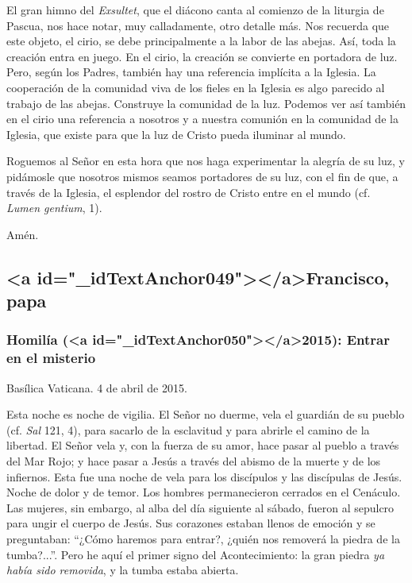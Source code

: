 			\begin{body}El gran himno del \textit{Exsultet}, que el diácono canta al comienzo de la liturgia de Pascua, nos hace notar, muy calladamente, otro detalle más. Nos recuerda que este objeto, el cirio, se debe principalmente a la labor de las abejas. Así, toda la creación entra en juego. En el cirio, la creación se convierte en portadora de luz. Pero, según los Padres, también hay una referencia implícita a la Iglesia. La cooperación de la comunidad viva de los fieles en la Iglesia es algo parecido al trabajo de las abejas. Construye la comunidad de la luz. Podemos ver así también en el cirio una referencia a nosotros y a nuestra comunión en la comunidad de la Iglesia, que existe para que la luz de Cristo pueda iluminar al mundo.\end{body}
			
			\begin{body}Roguemos al Señor en esta hora que nos haga experimentar la alegría de su luz, y pidámosle que nosotros mismos seamos portadores de su luz, con el fin de que, a través de la Iglesia, el esplendor del rostro de Cristo entre en el mundo (cf. \textit{Lumen gentium}, 1). \end{body}
			
			\begin{body}Amén.\end{body}
			
			\subsection{<a id="_idTextAnchor049"></a>Francisco, papa}
			
			\subsubsection{Homilía (<a id="_idTextAnchor050"></a>2015): Entrar en el misterio}
			
			\begin{referencia}Basílica Vaticana. 4 de abril de 2015.\end{referencia}
			
			\begin{body}Esta noche es noche de vigilia. El Señor no duerme, vela el guardián de su pueblo (cf. \textit{Sal} 121, 4), para sacarlo de la esclavitud y para abrirle el camino de la libertad. El Señor vela y, con la fuerza de su amor, hace pasar al pueblo a través del Mar Rojo; y hace pasar a Jesús a través del abismo de la muerte y de los infiernos. Esta fue una noche de vela para los discípulos y las discípulas de Jesús. Noche de dolor y de temor. Los hombres permanecieron cerrados en el Cenáculo. Las mujeres, sin embargo, al alba del día siguiente al sábado, fueron al sepulcro para ungir el cuerpo de Jesús. Sus corazones estaban llenos de emoción y se preguntaban: “¿Cómo haremos para entrar?, ¿quién nos removerá la piedra de la tumba?...”. Pero he aquí el primer signo del Acontecimiento: la gran piedra \textit{ya había sido removida}, y la tumba estaba abierta.\end{body}
			
